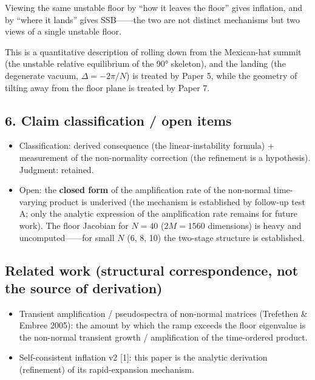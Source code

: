 \documentclass[
  a4paper,
]{ltjsarticle}
\providecommand{\tightlist}{%
  \setlength{\itemsep}{0pt}\setlength{\parskip}{0pt}}
\begin{document}
Viewing the same unstable floor by ``how it leaves the floor'' gives
inflation, and by ``where it lands'' gives SSB------the two are not
distinct mechanisms but two views of a single unstable floor.

This is a quantitative description of rolling down from the Mexican-hat
summit (the unstable relative equilibrium of the 90° skeleton), and the
landing (the degenerate vacuum, \(\Delta=-2\pi/N\)) is treated by Paper
5, while the geometry of tilting away from the floor plane is treated by
Paper 7.

\subsection{6. Claim classification / open
items}\label{claim-classification-open-items}

\begin{itemize}
\tightlist
\item
  Classification: derived consequence (the linear-instability formula) +
  measurement of the non-normality correction (the refinement is a
  hypothesis). Judgment: retained.
\item
  Open: the \textbf{closed form} of the amplification rate of the
  non-normal time-varying product is underived (the mechanism is
  established by follow-up test A; only the analytic expression of the
  amplification rate remains for future work). The floor Jacobian for
  \(N=40\) (\(2M=1560\) dimensions) is heavy and uncomputed------for
  small \(N\) (6, 8, 10) the two-stage structure is established.
\end{itemize}

\subsection{Related work (structural correspondence, not the source of
derivation)}\label{related-work-structural-correspondence-not-the-source-of-derivation}

\begin{itemize}
\tightlist
\item
  Transient amplification / pseudospectra of non-normal matrices
  (Trefethen \& Embree 2005): the amount by which the ramp exceeds the
  floor eigenvalue is the non-normal transient growth / amplification of
  the time-ordered product.
\item
  Self-consistent inflation v2 {[}1{]}: this paper is the analytic
  derivation (refinement) of its rapid-expansion mechanism.
\end{itemize}
\end{document}

